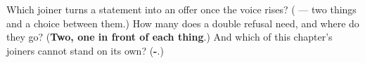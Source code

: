 \begin{tcolorbox}[breakable,colback=teal!4,colframe=teal!35!black,title={Before you move on}]
Which joiner turns a statement into an offer once the voice rises? (\textbf{} — two things and a choice between them.) How many \textbf{} does a double refusal need, and where do they go? (\textbf{Two, one in front of each thing}.) And which of this chapter's joiners cannot stand on its own? (\textbf{-}.)
\end{tcolorbox}
